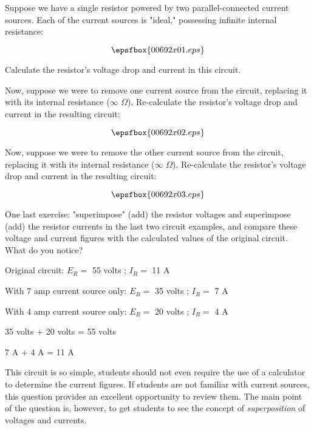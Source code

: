 

Suppose we have a single resistor powered by two parallel-connected current sources.  Each of the current sources is "ideal," possessing infinite internal resistance:

$$\epsfbox{00692x01.eps}$$

Calculate the resistor's voltage drop and current in this circuit.

\vskip 10pt

Now, suppose we were to remove one current source from the circuit, replacing it with its internal resistance ($\infty$ $\Omega$).  Re-calculate the resistor's voltage drop and current in the resulting circuit:

$$\epsfbox{00692x02.eps}$$

\vskip 10pt

Now, suppose we were to remove the other current source from the circuit, replacing it with its internal resistance ($\infty$ $\Omega$).  Re-calculate the resistor's voltage drop and current in the resulting circuit:

$$\epsfbox{00692x03.eps}$$

\vskip 10pt

One last exercise: "superimpose" (add) the resistor voltages and superimpose (add) the resistor currents in the last two circuit examples, and compare these voltage and current figures with the calculated values of the original circuit.  What do you notice?







Original circuit: $E_R =$ 55 volts ; $I_R =$ 11 A

\vskip 10pt

With 7 amp current source only: $E_R =$ 35 volts ; $I_R =$ 7 A

\vskip 10pt

With 4 amp current source only: $E_R =$ 20 volts ; $I_R =$ 4 A

\vskip 10pt

35 volts + 20 volts = 55 volts

7 A + 4 A = 11 A







This circuit is so simple, students should not even require the use of a calculator to determine the current figures.  If students are not familiar with current sources, this question provides an excellent opportunity to review them.  The main point of the question is, however, to get students to see the concept of {\it superposition} of voltages and currents.




